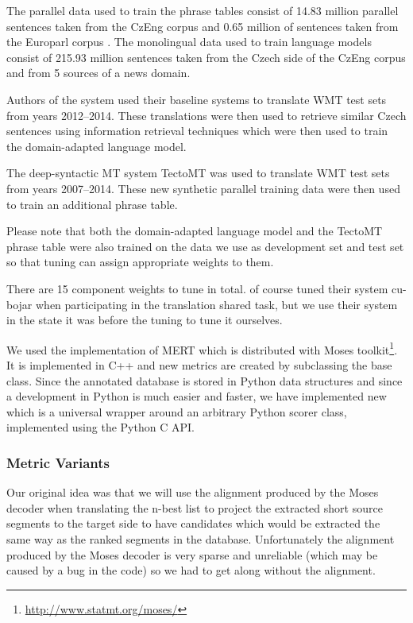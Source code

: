 The parallel data used to train the phrase tables consist of 14.83 million
parallel sentences taken from the CzEng corpus  and 0.65
million of sentences taken from the Europarl corpus .
The monolingual data used to train language models consist of 215.93 million
sentences taken from the Czech side of the CzEng corpus and from 5 sources of
a news domain. 

Authors of the system used their baseline systems to translate WMT test sets
from years 2012--2014.  These translations were then used to retrieve similar
Czech sentences using information retrieval techniques which were then used to
train the domain-adapted language model.

The deep-syntactic MT system TectoMT was used to translate WMT test sets from
years 2007--2014. These new synthetic parallel training data were then used to 
train an additional phrase table. 

Please note that both the domain-adapted language model and the TectoMT phrase
table were also trained on the data we use as development set and test set so
that tuning can assign appropriate weights to them.

There are 15 component weights to tune in total.  of
course tuned their system cu-bojar when participating in the translation shared
task, but we use their system in the state it was before the tuning to tune it ourselves. 

We used the implementation of MERT which is distributed with Moses
toolkit\footnote{\url{http://www.statmt.org/moses/}}. It is implemented in C++
and new metrics are created by subclassing the base  class. Since
the annotated database is stored in Python data structures and since a
development in Python is much easier and faster, we have implemented new
 which is a universal wrapper around an arbitrary Python
scorer class, implemented using the Python C API.


\subsubsection{Metric Variants}

Our original idea was that we will use the alignment produced by the Moses
decoder when translating the n-best list to project the extracted short
source segments to the target side to have candidates which would be extracted
the same way as the ranked segments in the database. Unfortunately the
alignment produced by the Moses decoder is very sparse and unreliable (which may be
caused by a bug in the code) so we had to get along without the alignment.

